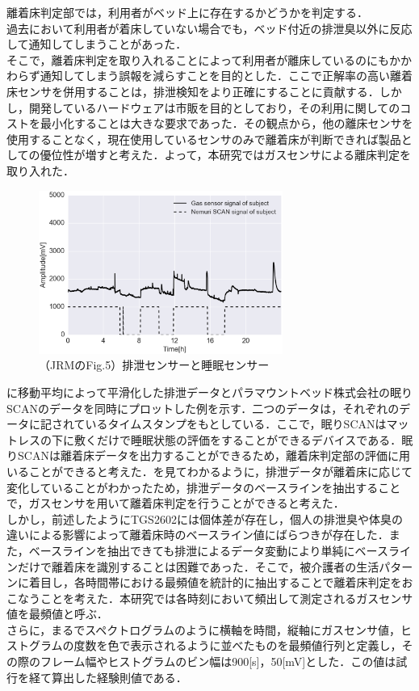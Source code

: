 離着床判定部では，利用者がベッド上に存在するかどうかを判定する．\\
過去において利用者が着床していない場合でも，ベッド付近の排泄臭以外に反応して通知してしまうことがあった．\\
そこで，離着床判定を取り入れることによって利用者が離床しているのにもかかわらず通知してしまう誤報を減らすことを目的とした．ここで正解率の高い離着床センサを併用することは，排泄検知をより正確にすることに貢献する．しかし，開発しているハードウェアは市販を目的としており，その利用に関してのコストを最小化することは大きな要求であった．その観点から，他の離床センサを使用することなく，現在使用しているセンサのみで離着床が判断できれば製品としての優位性が増すと考えた．よって，本研究ではガスセンサによる離床判定を取り入れた．
\begin{figure}[t]
\centering
\includegraphics[width=8cm]{./fig/inout3.eps}
\caption{（JRMのFig.5）排泄センサーと睡眠センサー}
\label{inout3}
\end{figure}

に移動平均によって平滑化した排泄データとパラマウントベッド株式会社の眠りSCANのデータを同時にプロットした例を示す．二つのデータは，それぞれのデータに記されているタイムスタンプをもとしている．ここで，眠りSCANはマットレスの下に敷くだけで睡眠状態の評価をすることができるデバイスである．眠りSCANは離着床データを出力することができるため，離着床判定部の評価に用いることができると考えた．を見てわかるように，排泄データが離着床に応じて変化していることがわかったため，排泄データのベースラインを抽出することで，ガスセンサを用いて離着床判定を行うことができると考えた．\\

しかし，前述したようにTGS2602には個体差が存在し，個人の排泄臭や体臭の違いによる影響によって離着床時のベースライン値にばらつきが存在した．また，ベースラインを抽出できても排泄によるデータ変動により単純にベースラインだけで離着床を識別することは困難であった．そこで，被介護者の生活パターンに着目し，各時間帯における最頻値を統計的に抽出することで離着床判定をおこなうことを考えた．本研究では各時刻において頻出して測定されるガスセンサ値を最頻値と呼ぶ．\\
さらに，まるでスペクトログラムのように横軸を時間，縦軸にガスセンサ値，ヒストグラムの度数を色で表示されるように並べたものを最頻値行列と定義し，その際のフレーム幅やヒストグラムのビン幅は900[s]，50[mV]とした．この値は試行を経て算出した経験則値である．

